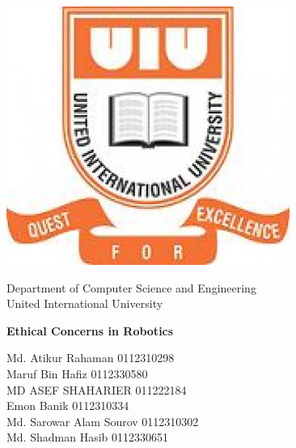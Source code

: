 \begin{titlepage}

\begin{center}
\includegraphics[scale=0.20]{./uiu}
\end{center}

\begin{center}
    \large {Department of Computer Science and Engineering\\
    United International University}
\end{center}

\vspace{1.5cm}


\begin{center}
    {\LARGE \bf Ethical Concerns in Robotics}
\end{center}

\vspace{1cm}

\begin{center}
    {\normalsize
    Md. Atikur Rahaman \hspace{3.4cm} 0112310298 \\
    Maruf Bin Hafiz \hspace{4.3cm} 0112330580 \\
    MD ASEF SHAHARIER \hspace{3.1cm} 011222184 \\
    Emon Banik \hspace{5.1cm} 0112310334 \\
    Md. Sarowar Alam Sourov \hspace{2.7cm} 0112310302 \\
    Md. Shadman Hasib \hspace{3.8cm} 0112330651
    }
\end{center}


\end{titlepage}
